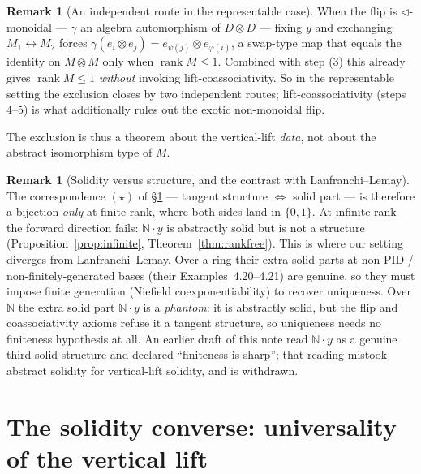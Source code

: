 \documentclass[11pt]{article}
\theoremstyle{definition}
\newtheorem{remark}[theorem]{Remark}
\newcommand{\N}{\mathbb{N}}
\newcommand{\rank}{\operatorname{rank}}
\begin{document}
\begin{remark}[An independent route in the representable case]\label{rem:repflip}
When the flip is $\lhd$-monoidal --- $\gamma$ an algebra automorphism of $D\otimes D$ --- fixing $y$
and exchanging $M_1\leftrightarrow M_2$ forces
$\gamma(e_i\otimes e_j)=e_{\psi(j)}\otimes e_{\varphi(i)}$, a swap-type map that equals the identity
on $M\otimes M$ only when $\rank M\le1$. Combined with step (3) this already gives $\rank M\le1$
\emph{without} invoking lift-coassociativity. So in the representable setting the exclusion closes by
two independent routes; lift-coassociativity (steps 4--5) is what additionally rules out the exotic
non-monoidal flip.
\end{remark}

The exclusion is thus a theorem about the vertical-lift \emph{data}, not about the abstract
isomorphism type of $M$.

\begin{remark}[Solidity versus structure, and the contrast with Lanfranchi--Lemay]\label{rem:part-not-structure}
The correspondence $(\star)$ of \S\ref{sec:converse} --- tangent structure $\iff$ solid part --- is
therefore a bijection \emph{only} at finite rank, where both sides land in $\{0,1\}$. At infinite
rank the forward direction fails: $\N\cdot y$ is abstractly solid but is not a structure
(Proposition~\ref{prop:infinite}, Theorem~\ref{thm:rankfree}). This is where our setting diverges
from Lanfranchi--Lemay. Over a ring their extra solid parts at non-PID / non-finitely-generated bases
(their Examples~4.20--4.21) are genuine, so they must impose finite generation (Niefield
coexponentiability) to recover uniqueness. Over $\N$ the extra solid part $\N\cdot y$ is a
\emph{phantom}: it is abstractly solid, but the flip and coassociativity axioms refuse it a tangent
structure, so uniqueness needs no finiteness hypothesis at all. An earlier draft of this note read
$\N\cdot y$ as a genuine third solid structure and declared ``finiteness is sharp''; that reading
mistook abstract solidity for vertical-lift solidity, and is withdrawn.
\end{remark}

\section{The solidity converse: universality of the vertical lift}\label{sec:converse}
\end{document}
